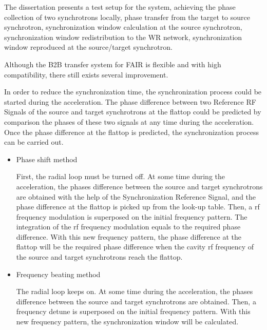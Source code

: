 The dissertation presents a test setup for the system, achieving the phase collection of two synchrotrons locally, phase transfer from the target to source synchrotron, synchronization window calculation at the source synchrotron, synchronization window redistribution to the WR network, synchronization window reproduced at the source/target synchrotron. 

Although the B2B transfer system for FAIR is flexible and with high compatibility, there still exists several improvement. 

In order to reduce the synchronization time, the synchronization process could be started during the acceleration. The phase
difference between two Reference RF Signals of the source and target synchrotrons at the flattop could be predicted by comparison the phases of these two signals at any time during the acceleration. Once the phase difference at the flattop is predicted, the synchronization process can be carried out. 
\begin{itemize}
	\item Phase shift method

First, the radial loop must be turned off. At some time during the acceleration, the phases difference between the source and target synchrotrons are obtained with the help of the Synchronization Reference Signal, and the phase difference at the flattop is picked up from the look-up table. Then, a rf frequency modulation is superposed on the initial frequency pattern. The integration of the rf frequency modulation equals to the required phase difference. With this new frequency pattern, the phase difference at the flattop will be the required phase difference when the cavity rf frequency of the source and target synchrotrons reach the flattop. 
	\item Frequency beating method

The radial loop keeps on. At some time during the acceleration, the phases difference between the source and target synchrotrons are obtained. Then, a frequency detune is superposed on the initial frequency pattern. With this new frequency pattern, the synchronization window will be calculated. 
\end{itemize}